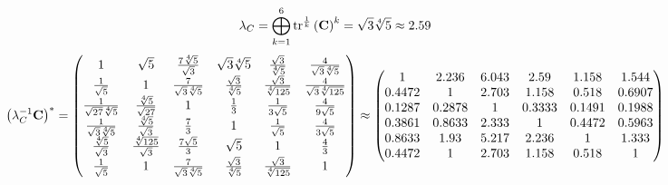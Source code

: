 \documentclass[10pt,a4paper]{article}
\begin{document}
	\[
		\lambda_{C} =  \bigoplus ^{6} _{k = 1} \operatorname{tr} ^{\frac 1 k} \left( \bold{C} \right)^k = {\sqrt{3}\sqrt[4]{5}} {}\approx 2.59
	\]
	\[
		\left(\lambda_{C}^{-1}\bold{C}\right)^* = 
		\begin{pmatrix}
			{1} {} & {\sqrt{5}} {} & \frac{{7}\sqrt[4]{5}} {\sqrt{3}} & {\sqrt{3}\sqrt[4]{5}} {} & \frac{\sqrt{3}} {\sqrt[4]{5}} & \frac{{4}} {\sqrt{3}\sqrt[4]{5}} \\
			\frac{1} {\sqrt{5}} & {1} {} & \frac{{7}} {\sqrt{3}\sqrt[4]{5}} & \frac{\sqrt{3}} {\sqrt[4]{5}} & \frac{\sqrt{3}} {\sqrt[4]{125}} & \frac{{4}} {\sqrt{3}\sqrt[4]{125}} \\
			\frac{1} {\sqrt{27}\sqrt[4]{5}} & \frac{\sqrt[4]{5}} {\sqrt{27}} & {1} {} & \frac{1} {{3}} & \frac{1} {{3}\sqrt{5}} & \frac{{4}} {{9}\sqrt{5}} \\
			\frac{1} {\sqrt{3}\sqrt[4]{5}} & \frac{\sqrt[4]{5}} {\sqrt{3}} & \frac{{7}} {{3}} & {1} {} & \frac{1} {\sqrt{5}} & \frac{{4}} {{3}\sqrt{5}} \\
			\frac{\sqrt[4]{5}} {\sqrt{3}} & \frac{\sqrt[4]{125}} {\sqrt{3}} & \frac{{7}\sqrt{5}} {{3}} & {\sqrt{5}} {} & {1} {} & \frac{{4}} {{3}} \\
			\frac{1} {\sqrt{5}} & {1} {} & \frac{{7}} {\sqrt{3}\sqrt[4]{5}} & \frac{\sqrt{3}} {\sqrt[4]{5}} & \frac{\sqrt{3}} {\sqrt[4]{125}} & {1} {} \\
		\end{pmatrix}
		\approx
		\begin{pmatrix}
			1        & 2.236    & 6.043    & 2.59     & 1.158    & 1.544    \\
			0.4472   & 1        & 2.703    & 1.158    & 0.518    & 0.6907   \\
			0.1287   & 0.2878   & 1        & 0.3333   & 0.1491   & 0.1988   \\
			0.3861   & 0.8633   & 2.333    & 1        & 0.4472   & 0.5963   \\
			0.8633   & 1.93     & 5.217    & 2.236    & 1        & 1.333    \\
			0.4472   & 1        & 2.703    & 1.158    & 0.518    & 1        \\
		\end{pmatrix}
	\]
\end{document}
